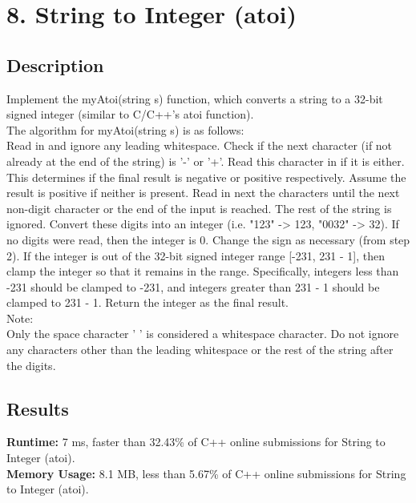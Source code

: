 \chapter{8. String to Integer (atoi)}
\section{Description}
Implement the myAtoi(string s) function, which converts a string to a 32-bit signed integer (similar to C/C++'s atoi function).
\\
The algorithm for myAtoi(string s) is as follows:
\\
    Read in and ignore any leading whitespace.
    Check if the next character (if not already at the end of the string) is '-' or '+'. Read this character in if it is either. This determines if the final result is negative or positive respectively. Assume the result is positive if neither is present.
    Read in next the characters until the next non-digit character or the end of the input is reached. The rest of the string is ignored.
    Convert these digits into an integer (i.e. "123" -> 123, "0032" -> 32). If no digits were read, then the integer is 0. Change the sign as necessary (from step 2).
    If the integer is out of the 32-bit signed integer range [-231, 231 - 1], then clamp the integer so that it remains in the range. Specifically, integers less than -231 should be clamped to -231, and integers greater than 231 - 1 should be clamped to 231 - 1.
    Return the integer as the final result.
\\
Note:
\\
    Only the space character ' ' is considered a whitespace character.
    Do not ignore any characters other than the leading whitespace or the rest of the string after the digits.

\section{Results}
\textbf{Runtime:}
7 ms, faster than 32.43\% of C++ online submissions for String to Integer (atoi).\\
\textbf{Memory Usage:}
8.1 MB, less than 5.67\% of C++ online submissions for String to Integer (atoi).\\
\newpage
